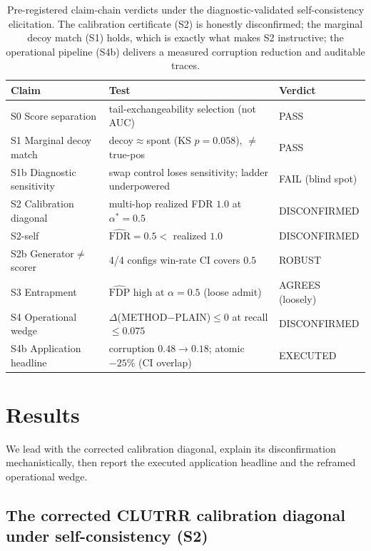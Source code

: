 \documentclass[11pt,letterpaper]{article}
\begin{document}
\begin{table}[t]
\centering
\small
\begin{tabular}{lll}
\toprule
Claim & Test & Verdict \\
\midrule
S0 Score separation & tail-exchangeability selection (not AUC) & PASS \\
S1 Marginal decoy match & decoy$\approx$spont (KS $p{=}0.058$), $\neq$ true-pos & PASS \\
S1b Diagnostic sensitivity & swap control loses sensitivity; ladder underpowered & FAIL (blind spot) \\
S2 Calibration diagonal & multi-hop realized FDR $1.0$ at $\alpha^{*}{=}0.5$ & DISCONFIRMED \\
S2-self & $\widehat{\mathrm{FDR}}{=}0.5 <$ realized $1.0$ & DISCONFIRMED \\
S2b Generator$\neq$scorer & 4/4 configs win-rate CI covers $0.5$ & ROBUST \\
S3 Entrapment & $\widehat{\mathrm{FDP}}$ high at $\alpha{=}0.5$ (loose admit) & AGREES (loosely) \\
S4 Operational wedge & $\Delta$(METHOD$-$PLAIN)$\le0$ at recall $\le0.075$ & DISCONFIRMED \\
S4b Application headline & corruption $0.48{\to}0.18$; atomic $-25\%$ (CI overlap) & EXECUTED \\
\bottomrule
\end{tabular}
\caption{Pre-registered claim-chain verdicts under the diagnostic-validated self-consistency elicitation. The calibration certificate (S2) is honestly disconfirmed; the marginal decoy match (S1) holds, which is exactly what makes S2 instructive; the operational pipeline (S4b) delivers a measured corruption reduction and auditable traces.}
\label{tab:claims}
\end{table}

\section{Results}

We lead with the corrected calibration diagonal, explain its disconfirmation mechanistically, then report the executed application headline and the reframed operational wedge.

\subsection{The corrected CLUTRR calibration diagonal under self-consistency (S2)}
\end{document}
